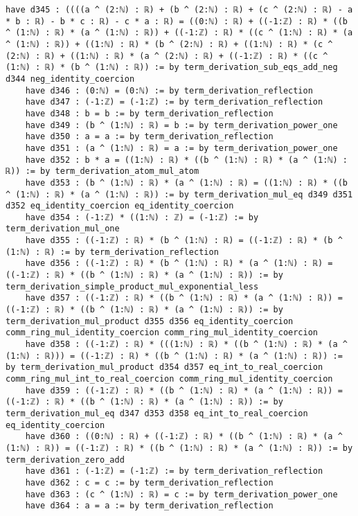 \documentclass{article}
\begin{document}
\begin{tcolorbox}[colback=white!10, width=\linewidth]
\begin{lstlisting}[language=Lean4]
    have d345 : ((((a ^ (2:ℕ) : ℝ) + (b ^ (2:ℕ) : ℝ) + (c ^ (2:ℕ) : ℝ) - a * b : ℝ) - b * c : ℝ) - c * a : ℝ) = ((0:ℕ) : ℝ) + ((-1:ℤ) : ℝ) * ((b ^ (1:ℕ) : ℝ) * (a ^ (1:ℕ) : ℝ)) + ((-1:ℤ) : ℝ) * ((c ^ (1:ℕ) : ℝ) * (a ^ (1:ℕ) : ℝ)) + ((1:ℕ) : ℝ) * (b ^ (2:ℕ) : ℝ) + ((1:ℕ) : ℝ) * (c ^ (2:ℕ) : ℝ) + ((1:ℕ) : ℝ) * (a ^ (2:ℕ) : ℝ) + ((-1:ℤ) : ℝ) * ((c ^ (1:ℕ) : ℝ) * (b ^ (1:ℕ) : ℝ)) := by term_derivation_sub_eqs_add_neg d344 neg_identity_coercion
    have d346 : (0:ℕ) = (0:ℕ) := by term_derivation_reflection
    have d347 : (-1:ℤ) = (-1:ℤ) := by term_derivation_reflection
    have d348 : b = b := by term_derivation_reflection
    have d349 : (b ^ (1:ℕ) : ℝ) = b := by term_derivation_power_one
    have d350 : a = a := by term_derivation_reflection
    have d351 : (a ^ (1:ℕ) : ℝ) = a := by term_derivation_power_one
    have d352 : b * a = ((1:ℕ) : ℝ) * ((b ^ (1:ℕ) : ℝ) * (a ^ (1:ℕ) : ℝ)) := by term_derivation_atom_mul_atom
    have d353 : (b ^ (1:ℕ) : ℝ) * (a ^ (1:ℕ) : ℝ) = ((1:ℕ) : ℝ) * ((b ^ (1:ℕ) : ℝ) * (a ^ (1:ℕ) : ℝ)) := by term_derivation_mul_eq d349 d351 d352 eq_identity_coercion eq_identity_coercion
    have d354 : (-1:ℤ) * ((1:ℕ) : ℤ) = (-1:ℤ) := by term_derivation_mul_one
    have d355 : ((-1:ℤ) : ℝ) * (b ^ (1:ℕ) : ℝ) = ((-1:ℤ) : ℝ) * (b ^ (1:ℕ) : ℝ) := by term_derivation_reflection
    have d356 : ((-1:ℤ) : ℝ) * (b ^ (1:ℕ) : ℝ) * (a ^ (1:ℕ) : ℝ) = ((-1:ℤ) : ℝ) * ((b ^ (1:ℕ) : ℝ) * (a ^ (1:ℕ) : ℝ)) := by term_derivation_simple_product_mul_exponential_less
    have d357 : ((-1:ℤ) : ℝ) * ((b ^ (1:ℕ) : ℝ) * (a ^ (1:ℕ) : ℝ)) = ((-1:ℤ) : ℝ) * ((b ^ (1:ℕ) : ℝ) * (a ^ (1:ℕ) : ℝ)) := by term_derivation_mul_product d355 d356 eq_identity_coercion comm_ring_mul_identity_coercion comm_ring_mul_identity_coercion
    have d358 : ((-1:ℤ) : ℝ) * (((1:ℕ) : ℝ) * ((b ^ (1:ℕ) : ℝ) * (a ^ (1:ℕ) : ℝ))) = ((-1:ℤ) : ℝ) * ((b ^ (1:ℕ) : ℝ) * (a ^ (1:ℕ) : ℝ)) := by term_derivation_mul_product d354 d357 eq_int_to_real_coercion comm_ring_mul_int_to_real_coercion comm_ring_mul_identity_coercion
    have d359 : ((-1:ℤ) : ℝ) * ((b ^ (1:ℕ) : ℝ) * (a ^ (1:ℕ) : ℝ)) = ((-1:ℤ) : ℝ) * ((b ^ (1:ℕ) : ℝ) * (a ^ (1:ℕ) : ℝ)) := by term_derivation_mul_eq d347 d353 d358 eq_int_to_real_coercion eq_identity_coercion
    have d360 : ((0:ℕ) : ℝ) + ((-1:ℤ) : ℝ) * ((b ^ (1:ℕ) : ℝ) * (a ^ (1:ℕ) : ℝ)) = ((-1:ℤ) : ℝ) * ((b ^ (1:ℕ) : ℝ) * (a ^ (1:ℕ) : ℝ)) := by term_derivation_zero_add
    have d361 : (-1:ℤ) = (-1:ℤ) := by term_derivation_reflection
    have d362 : c = c := by term_derivation_reflection
    have d363 : (c ^ (1:ℕ) : ℝ) = c := by term_derivation_power_one
    have d364 : a = a := by term_derivation_reflection

\end{lstlisting}
\end{tcolorbox}
\end{document}

